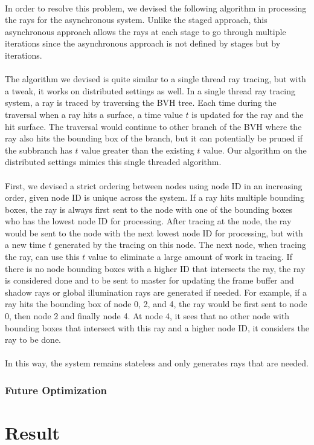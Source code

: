 \documentclass[a4paper, oneside, 10pt]{article}
\begin{document}
\paragraph{} In order to resolve this problem, we devised the following algorithm in processing the rays for the asynchronous system.  Unlike the staged approach, this asynchronous approach allows the rays at each stage to go through multiple iterations since the asynchronous approach is not defined by stages but by iterations.
\paragraph{} The algorithm we devised is quite similar to a single thread ray tracing, but with a tweak, it works on distributed settings as well.  In a single thread ray tracing system, a ray is traced by traversing the BVH tree. Each time during the traversal when a ray hits a surface, a time value $t$ is updated for the ray and the hit surface.  The traversal would continue to other branch of the BVH where the ray also hits the bounding box of the branch, but it can potentially be pruned if the subbranch has $t$ value greater than the existing $t$ value. Our algorithm on the distributed settings mimics this single threaded algorithm.
\paragraph{} First, we devised a strict ordering between nodes using node ID in an increasing order, given node ID is unique across the system. If a ray hits multiple bounding boxes, the ray is always first sent to the node with one of the bounding boxes who has the lowest node ID for processing.  After tracing at the node, the ray would be sent to the node with the next lowest node ID for processing, but with a new time $t$ generated by the tracing on this node. The next node, when tracing the ray, can use this $t$ value to eliminate a large amount of work in tracing. If there is no node bounding boxes with a higher ID that intersects the ray, the ray is considered done and to be sent to master for updating the frame buffer and shadow rays or global illumination rays are generated if needed.  For example, if a ray hits the bounding box of node 0, 2, and 4, the ray would be first sent to node 0, then node 2 and finally node 4. At node 4, it sees that no other node with bounding boxes that intersect with this ray and a higher node ID, it considers the ray to be done.
\paragraph{} In this way, the system remains stateless and only generates rays that are needed. 

\subsubsection{Future Optimization}
\section{Result}





\end{document}
